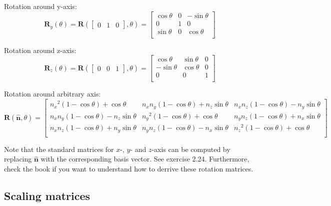 \documentclass[11pt]{article}
\begin{document}
Rotation around y-axis: \\
$$
\mathbf{R}_{y}(\theta) = 
\mathbf{R}(
\begin{bmatrix}
0 & 1 & 0 
\end{bmatrix},
\theta) = \begin{bmatrix}
{\cos\theta} & 0 & {- \sin\theta} \\
0 & 1 & 0 \\
{\sin\theta} & 0 & {\cos\theta} \\
\end{bmatrix}
$$

Rotation around z-axis: \\
$$
\mathbf{R}_{z}(\theta) =
\mathbf{R}(
\begin{bmatrix}
0 & 0 & 1
\end{bmatrix},
\theta) =
\begin{bmatrix}
{\cos\theta} & {\sin\theta} & 0 \\
{- \sin\theta} & {\cos\theta} & 0 \\
0 & 0 & 1 \\
\end{bmatrix}
$$

Rotation around arbitrary axis: \\
$$
\mathbf{R}(\hat{\mathbf{n}},\theta) =
\begin{bmatrix}
{{n_{x}}^{2}\left( 1 - \cos\theta \right) + \cos\theta} & {n_{x}n_{y}\left( 1 - \cos\theta \right) + n_{z}\sin\theta} & {n_{x}n_{z}\left( 1 - \cos\theta \right) - n_{y}\sin\theta} \\
{n_{x}n_{y}\left( 1 - \cos\theta \right) - n_{z}\sin\theta} & {{n_{y}}^{2}\left( 1 - \cos\theta \right) + \cos\theta} & {n_{y}n_{z}\left( 1 - \cos\theta \right) + n_{x}\sin\theta} \\
{n_{x}n_{z}\left( 1 - \cos\theta \right) + n_{y}\sin\theta} & {n_{y}n_{z}\left( 1 - \cos\theta \right) - n_{x}\sin\theta} & {{n_{z}}^{2}\left( 1 - \cos\theta \right) + \cos\theta} \\
\end{bmatrix}
$$

Note that the standard matrices for $x$-, $y$- and $z$-axis can be computed by replacing $\hat{\textbf{n}}$ with the corresponding basis vector. See exercise 2.24. Furthermore, check the book if you want to understand how to derrive these rotation matrices.

\subsection{Scaling matrices}
\end{document}
